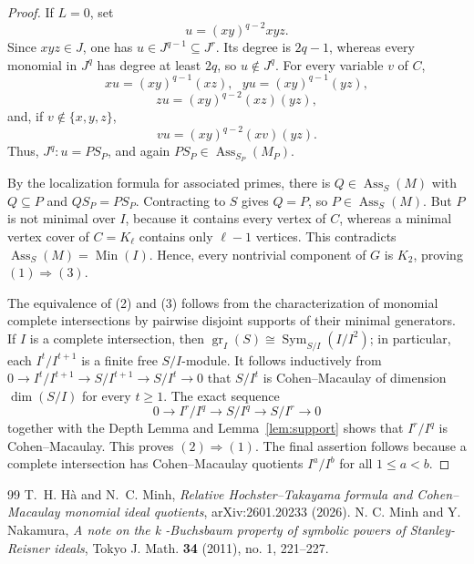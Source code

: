 \documentclass[10pt,a4paper]{amsart}
\begin{document}
\begin{proof}
If $L=0$, set
$$
u=(xy)^{q-2}xyz.
$$
Since $xyz\in J$, one has $u\in J^{q-1}\subseteq J^r$. Its degree is
$2q-1$, whereas every monomial in $J^q$ has degree at least $2q$, so
$u\notin J^q$. For every variable $v$ of $C$,
$$
xu=(xy)^{q-1}(xz),\text{ } yu=(xy)^{q-1}(yz),
$$
$$
zu=(xy)^{q-2}(xz)(yz),
$$
and, if $v\notin\{x,y,z\}$,
$$
vu=(xy)^{q-2}(xv)(yz).
$$
Thus, $J^q:u=PS_P$, and again $PS_P\in\operatorname{Ass}_{S_P}(M_P)$.

By the localization formula for associated primes, there is
$Q\in\operatorname{Ass}_S(M)$ with $Q\subseteq P$ and
$QS_P=PS_P$. Contracting to $S$ gives $Q=P$, so
$P\in\operatorname{Ass}_S(M)$. But $P$ is not minimal over $I$,
because it contains every vertex of $C$, whereas a minimal vertex cover of
$C=K_\ell$ contains only $\ell-1$ vertices. This contradicts
$\operatorname{Ass}_S(M)=\operatorname{Min}(I)$. Hence, every nontrivial
component of $G$ is $K_2$, proving $(1)\Rightarrow(3)$.

The equivalence of (2) and (3) follows from the characterization of monomial
complete intersections by pairwise disjoint supports of their minimal
generators. If $I$ is a complete intersection, then
$\operatorname{gr}_I(S)\cong\operatorname{Sym}_{S/I}(I/I^2)$; in particular,
each $I^t/I^{t+1}$ is a finite free $S/I$-module. It follows inductively from
$0\to I^t/I^{t+1}\to S/I^{t+1}\to S/I^t\to0$ that $S/I^t$ is
Cohen--Macaulay of dimension $\dim(S/I)$ for every $t\ge1$. The exact
sequence
$$
0\longrightarrow I^r/I^q\longrightarrow S/I^q\longrightarrow S/I^r
\longrightarrow0
$$
together with the Depth Lemma and Lemma~\ref{lem:support} shows that
$I^r/I^q$ is Cohen--Macaulay. This
proves $(2)\Rightarrow(1)$. The final assertion follows because a complete
intersection has Cohen--Macaulay quotients $I^a/I^b$ for all $1\le a<b$.
\end{proof}

\begin{thebibliography}{99}
 T.~H. H\`a and N.~C. Minh, \emph{Relative Hochster--Takayama formula and Cohen--Macaulay monomial ideal quotients}, arXiv:2601.20233 (2026).
 N. C. Minh and Y. Nakamura, \emph{A note on the k -Buchsbaum property of symbolic powers of Stanley-Reisner ideals}, Tokyo J. Math. \textbf{34} (2011), no. 1, 221–227.
\end{thebibliography}
\end{document}
